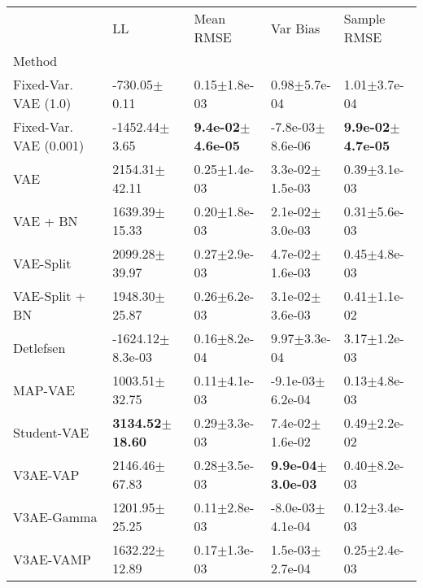 \begin{tabular}{lllll}
\toprule
{} &                          LL &                     Mean RMSE &                      Var Bias &                   Sample RMSE \\
Method                 &                             &                               &                               &                               \\
\midrule
Fixed-Var. VAE (1.0)   &            -730.05$\pm$0.11 &              0.15$\pm$1.8e-03 &              0.98$\pm$5.7e-04 &              1.01$\pm$3.7e-04 \\
Fixed-Var. VAE (0.001) &           -1452.44$\pm$3.65 &  \textbf{9.4e-02$\pm$4.6e-05} &          -7.8e-03$\pm$8.6e-06 &  \textbf{9.9e-02$\pm$4.7e-05} \\
VAE                    &           2154.31$\pm$42.11 &              0.25$\pm$1.4e-03 &           3.3e-02$\pm$1.5e-03 &              0.39$\pm$3.1e-03 \\
VAE + BN               &           1639.39$\pm$15.33 &              0.20$\pm$1.8e-03 &           2.1e-02$\pm$3.0e-03 &              0.31$\pm$5.6e-03 \\
VAE-Split              &           2099.28$\pm$39.97 &              0.27$\pm$2.9e-03 &           4.7e-02$\pm$1.6e-03 &              0.45$\pm$4.8e-03 \\
VAE-Split + BN         &           1948.30$\pm$25.87 &              0.26$\pm$6.2e-03 &           3.1e-02$\pm$3.6e-03 &              0.41$\pm$1.1e-02 \\
Detlefsen              &        -1624.12$\pm$8.3e-03 &              0.16$\pm$8.2e-04 &              9.97$\pm$3.3e-04 &              3.17$\pm$1.2e-03 \\
MAP-VAE                &           1003.51$\pm$32.75 &              0.11$\pm$4.1e-03 &          -9.1e-03$\pm$6.2e-04 &              0.13$\pm$4.8e-03 \\
Student-VAE            &  \textbf{3134.52$\pm$18.60} &              0.29$\pm$3.3e-03 &           7.4e-02$\pm$1.6e-02 &              0.49$\pm$2.2e-02 \\
V3AE-VAP               &           2146.46$\pm$67.83 &              0.28$\pm$3.5e-03 &  \textbf{9.9e-04$\pm$3.0e-03} &              0.40$\pm$8.2e-03 \\
V3AE-Gamma             &           1201.95$\pm$25.25 &              0.11$\pm$2.8e-03 &          -8.0e-03$\pm$4.1e-04 &              0.12$\pm$3.4e-03 \\
V3AE-VAMP              &           1632.22$\pm$12.89 &              0.17$\pm$1.3e-03 &           1.5e-03$\pm$2.7e-04 &              0.25$\pm$2.4e-03 \\

\end{tabular}
